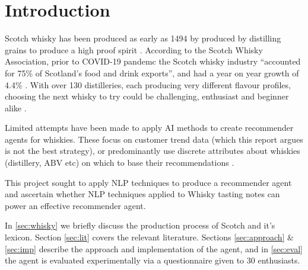 \section{Introduction}\label{sec:intro}
Scotch whisky has been produced as early as 1494 by produced by distilling grains to produce
a high proof spirit \cite{Jacques2003, Pyke1965}.
According to the Scotch Whisky Association, prior to COVID-19 pandemc the Scotch whisky industry 
``accounted for 75\% of Scotland's food and drink exports'', and had a year on year growth of 4.4\% 
\cite{swa2, swa}.
With over 130 distilleries, each producing very different flavour profiles, choosing the next whisky to try 
could be challenging, enthusiast and beginner alike \cite{n_distilleries, powell_2021}.

Limited attempts have been made to apply AI methods to create recommender agents for whiskies.
These focus on customer trend data (which this report argues is not the best strategy), or predominantly
use discrete attributes about whiskies (distillery, ABV etc) on which to base their recommendations
\cite{Omidzohoor, Coldevin2005}.

This project sought to apply NLP techniques to produce a recommender agent and ascertain whether
NLP techniques applied to Whisky tasting notes can power an effective recommender agent.  

In \autoref{sec:whisky} we briefly discuss the production process of Scotch and it's lexicon. Section 
\ref{sec:lit} covers the relevant literature. Sections 
\ref{sec:approach} \& \ref{sec:imp} describe the approach and implementation of the agent, and in 
\autoref{sec:eval} the agent is evaluated experimentally via a questionnaire given to 30 enthusiasts.